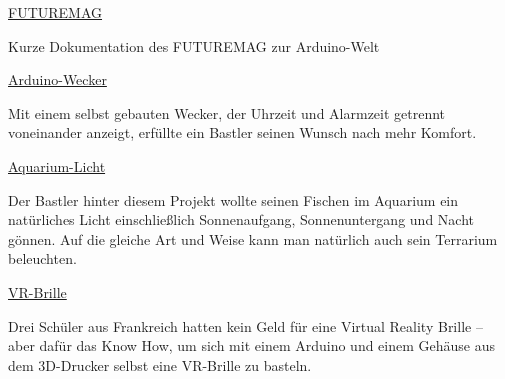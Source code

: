 \vfill


\begin{links}
	\item \href{https://www.youtube.com/watch?v=EbVmfGNwn0g}{FUTUREMAG}
	
	Kurze Dokumentation des FUTUREMAG zur Arduino-Welt
	
	\item \href{https://www.heise.de/make/meldung/Mehr-Komfort-der-Arduino-Ueberkopfwecker-4046184.html}{Arduino-Wecker}
	
	Mit einem selbst gebauten Wecker, der Uhrzeit und Alarmzeit getrennt voneinander anzeigt, erfüllte ein Bastler seinen Wunsch nach mehr Komfort.
	
	\item \href{https://www.instructables.com/id/Aquarium-LED-Controller/}{Aquarium-Licht}
	
	Der Bastler hinter diesem Projekt wollte seinen Fischen im Aquarium ein natürliches Licht einschließlich Sonnenaufgang, Sonnenuntergang und Nacht gönnen. Auf die gleiche Art und Weise kann man natürlich auch sein Terrarium beleuchten.
	
	\item \href{https://www.heise.de/make/meldung/Kein-Geld-fuer-eine-Oculus-Rift-VR-Brille-selbstgebaut-3949507.html}{VR-Brille}
	
	Drei Schüler aus Frankreich hatten kein Geld für eine Virtual Reality Brille – aber dafür das Know How, um sich mit einem Arduino und einem Gehäuse aus dem 3D-Drucker selbst eine VR-Brille zu basteln.
\end{links}


